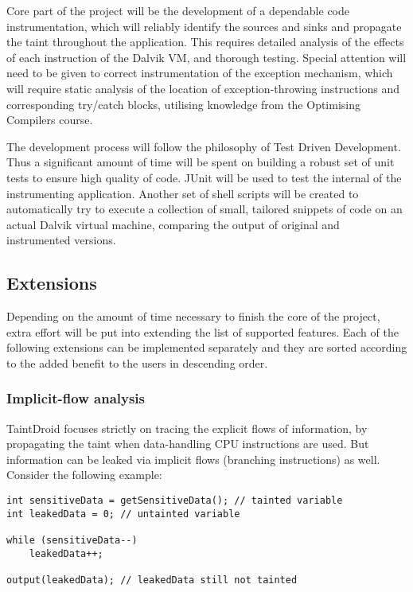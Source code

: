 \documentclass[12pt]{article}
\begin{document}
Core part of the project will be the development of a dependable code 
instrumentation, which will reliably identify the sources and sinks and
propagate the taint throughout the application. This requires detailed
analysis of the effects of each instruction of the Dalvik VM, and 
thorough testing. Special attention will need to be given to correct 
instrumentation of the exception mechanism, which will require static 
analysis of the location of exception-throwing instructions and 
corresponding try/catch blocks, utilising knowledge from the Optimising
Compilers course.

The development process will follow the philosophy of Test Driven 
Development. Thus a significant amount of time will be spent on building 
a robust set of unit tests to ensure high quality of code. JUnit will be 
used to test the internal of the instrumenting application. Another set of 
shell scripts will be created to automatically try to execute a collection
of small, tailored snippets of code on an actual Dalvik virtual machine, 
comparing the output of original and instrumented versions.

\subsection*{Extensions}

Depending on the amount of time necessary to finish the core of the project,
extra effort will be put into extending the list of supported features. Each 
of the following extensions can be implemented separately and they are 
sorted according to the added benefit to the users in descending order.

\subsubsection*{Implicit-flow analysis}

TaintDroid focuses strictly on tracing the explicit flows of information, 
by propagating the taint when data-handling CPU instructions are used. 
But information can be leaked via implicit flows (branching instructions) 
as well. Consider the following example:

\begin{verbatim}
int sensitiveData = getSensitiveData(); // tainted variable
int leakedData = 0; // untainted variable

while (sensitiveData--)
    leakedData++;

output(leakedData); // leakedData still not tainted
\end{verbatim}
\end{document}
